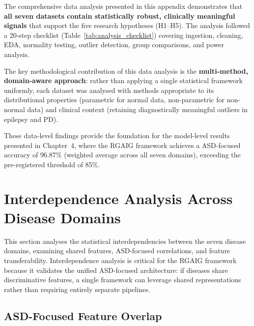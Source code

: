 The comprehensive data analysis presented in this appendix demonstrates that \textbf{all seven datasets contain statistically robust, clinically meaningful signals} that support the five research hypotheses (H1--H5). The analysis followed a 20-step checklist (Table~\ref{tab:analysis_checklist}) covering ingestion, cleaning, EDA, normality testing, outlier detection, group comparisons, and power analysis.

The key methodological contribution of this data analysis is the \textbf{multi-method, domain-aware approach}: rather than applying a single statistical framework uniformly, each dataset was analysed with methods appropriate to its distributional properties (parametric for normal data, non-parametric for non-normal data) and clinical context (retaining diagnostically meaningful outliers in epilepsy and PD).

These data-level findings provide the foundation for the model-level results presented in Chapter~4, where the RGAIG framework achieves a ASD-focused accuracy of 96.87\% (weighted average across all seven domains), exceeding the pre-registered threshold of 85\%.


\section{Interdependence Analysis Across Disease Domains}
\label{sec:interdependence_analysis}

This section analyses the statistical interdependencies between the seven disease domains, examining shared features, ASD-focused correlations, and feature transferability. Interdependence analysis is critical for the RGAIG framework because it validates the unified ASD-focused architecture: if diseases share discriminative features, a single framework can leverage shared representations rather than requiring entirely separate pipelines.

\subsection{ASD-Focused Feature Overlap}

